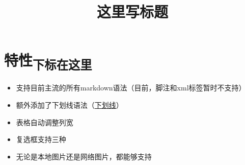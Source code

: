\documentclass[UTF8]{ctexart}
\title{这里写标题}
\newenvironment{marktext}{}{}
\begin{document}
\normalsize
\tableofcontents
\newpage
\begin{marktext}









\section{特性\textsubscript{下标在这里}}


\end{marktext}
\begin{itemize}
\item
支持目前主流的所有markdown语法（目前，脚注和xml标签暂时不支持）
\item
额外添加了下划线语法（\underline{下划线}）
\item
表格自动调整列宽
\item
复选框支持三种
\item
无论是本地图片还是网络图片，都能够支持
\end{itemize}
\end{document}
